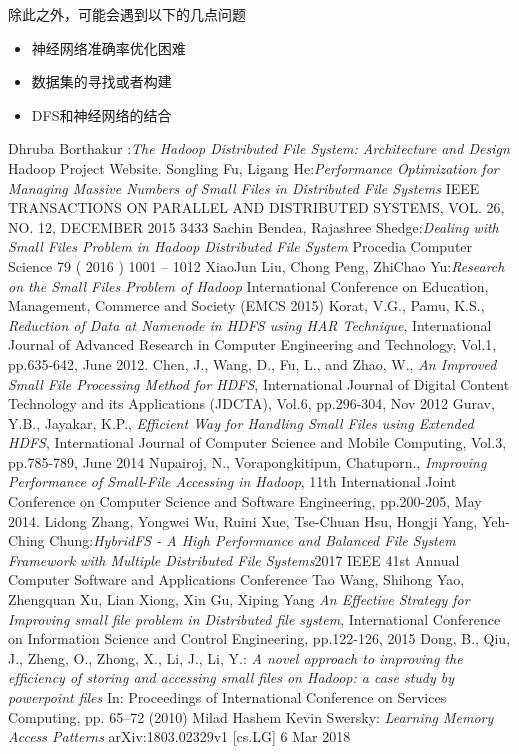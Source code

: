 \documentclass[UTF8]{ctexart}
\begin{document}
除此之外，可能会遇到以下的几点问题
\begin{itemize}
\item 神经网络准确率优化困难
\item 数据集的寻找或者构建
\item DFS和神经网络的结合
\end{itemize}



\begin{thebibliography}{99}
 Dhruba Borthakur :\emph{The Hadoop Distributed File System: Architecture and Design}  Hadoop Project Website.
Songling Fu, Ligang He:\emph{Performance Optimization for Managing Massive Numbers of Small Files in Distributed File Systems} IEEE TRANSACTIONS ON PARALLEL AND DISTRIBUTED SYSTEMS, VOL. 26, NO. 12, DECEMBER 2015 3433
Sachin Bendea, Rajashree Shedge:\emph{Dealing with Small Files Problem in Hadoop Distributed File System} Procedia Computer Science 79 ( 2016 ) 1001 – 1012
XiaoJun Liu, Chong Peng, ZhiChao Yu:\emph{Research on the Small Files Problem of Hadoop} International Conference on Education, Management, Commerce and Society (EMCS 2015)
Korat, V.G., Pamu, K.S., \emph{Reduction of Data at Namenode in HDFS using HAR Technique}, International Journal of Advanced Research in Computer Engineering and Technology, Vol.1, pp.635-642, June 2012.
Chen, J., Wang, D., Fu, L., and Zhao, W., \emph{An Improved Small File Processing Method for HDFS}, International Journal of Digital Content
Technology and its Applications (JDCTA), Vol.6, pp.296-304, Nov 2012
Gurav, Y.B., Jayakar, K.P., \emph{Efficient Way for Handling Small Files using Extended HDFS}, International Journal of Computer Science and
Mobile Computing, Vol.3, pp.785-789, June 2014
Nupairoj, N., Vorapongkitipun, Chatuporn., \emph{Improving Performance of Small-File Accessing in Hadoop}, 11th International Joint
Conference on Computer Science and Software Engineering, pp.200-205, May 2014.
Lidong Zhang, Yongwei Wu, Ruini Xue, Tse-Chuan Hsu, Hongji Yang, Yeh-Ching Chung:\emph{HybridFS - A High Performance and Balanced File System Framework with Multiple Distributed File Systems}2017 IEEE 41st Annual Computer Software and Applications Conference
Tao Wang, Shihong Yao, Zhengquan Xu, Lian Xiong, Xin Gu, Xiping Yang \emph{An Effective Strategy for Improving small file problem in Distributed file system}, International Conference on Information Science and Control Engineering, pp.122-126, 2015
Dong, B., Qiu, J., Zheng, O., Zhong, X., Li, J., Li, Y.: \emph{A novel approach to improving the efﬁciency of storing and accessing small ﬁles on Hadoop: a case study by powerpoint ﬁles} In: Proceedings of International Conference on Services Computing, pp. 65–72 (2010) 
Milad Hashem Kevin Swersky: \emph{Learning Memory Access Patterns} arXiv:1803.02329v1 [cs.LG] 6 Mar 2018
\end{thebibliography}
\end{document}
